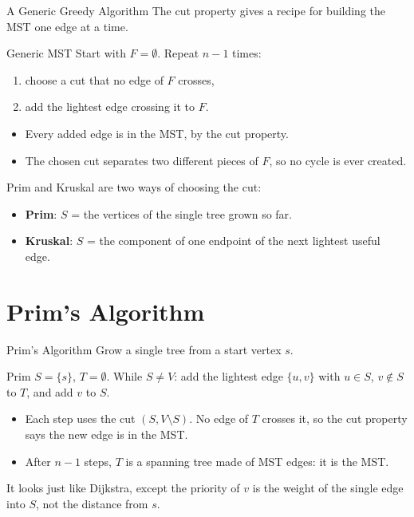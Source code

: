 \documentclass[10pt,aspectratio=169]{beamer}
\begin{document}
\begin{frame}{A Generic Greedy Algorithm}
  The cut property gives a recipe for building the MST one edge at a time.

  \begin{block}{Generic MST}
    Start with $F = \emptyset$. Repeat $n - 1$ times:
    \begin{enumerate}
      \item choose a cut that \alert{no edge of $F$ crosses},
      \item add the lightest edge crossing it to $F$.
    \end{enumerate}
  \end{block}

  \begin{itemize}
    \item Every added edge is in the MST, by the cut property.
    \item The chosen cut separates two different pieces of $F$, so no cycle
          is ever created.
  \end{itemize}

  \pause
  \medskip
  Prim and Kruskal are two ways of choosing the cut:
  \begin{itemize}
    \item \textbf{Prim}: $S$ = the vertices of the single tree grown so far.
    \item \textbf{Kruskal}: $S$ = the component of one endpoint of the next
          lightest useful edge.
  \end{itemize}
\end{frame}

\section{Prim's Algorithm}

\begin{frame}{Prim's Algorithm}
  Grow a single tree from a start vertex $s$.

  \begin{block}{Prim}
    $S = \{s\}$, $T = \emptyset$. While $S \ne V$: add the lightest edge
    $\{u, v\}$ with $u \in S$, $v \notin S$ to $T$, and add $v$ to $S$.
  \end{block}

  \bigskip
  \begin{itemize}
    \item Each step uses the cut $(S, V \setminus S)$. No edge of $T$ crosses
          it, so the cut property says the new edge is in the MST.
    \item After $n - 1$ steps, $T$ is a spanning tree made of MST edges: it is
          the MST.
  \end{itemize}

  \bigskip
  It looks just like Dijkstra, except the priority of $v$ is the weight of
  the \alert{single edge} into $S$, not the distance from $s$.
\end{frame}
\end{document}
